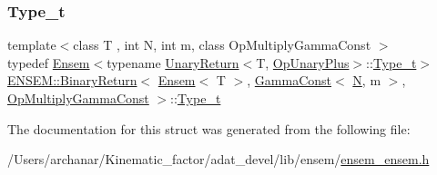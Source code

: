 \subsubsection{\texorpdfstring{Type\_t}{Type\_t}\hspace{0.1cm}{\footnotesize\ttfamily [2/2]}}
{\footnotesize\ttfamily template$<$class T , int N, int m, class Op\+Multiply\+Gamma\+Const $>$ \\
typedef \mbox{\hyperlink{classENSEM_1_1Ensem}{Ensem}}$<$typename \mbox{\hyperlink{structENSEM_1_1UnaryReturn}{Unary\+Return}}$<$T, \mbox{\hyperlink{structENSEM_1_1OpUnaryPlus}{Op\+Unary\+Plus}}$>$\+::\mbox{\hyperlink{structENSEM_1_1BinaryReturn_3_01Ensem_3_01T_01_4_00_01GammaConst_3_01N_00_01m_01_4_00_01OpMultiplyGammaConst_01_4_a1e55c80ef6e9dca68a09e4de3cc64da6}{Type\+\_\+t}}$>$ \mbox{\hyperlink{structENSEM_1_1BinaryReturn}{E\+N\+S\+E\+M\+::\+Binary\+Return}}$<$ \mbox{\hyperlink{classENSEM_1_1Ensem}{Ensem}}$<$ T $>$, \mbox{\hyperlink{classENSEM_1_1GammaConst}{Gamma\+Const}}$<$ \mbox{\hyperlink{operator__name__util_8cc_a7722c8ecbb62d99aee7ce68b1752f337}{N}}, m $>$, \mbox{\hyperlink{structENSEM_1_1OpMultiplyGammaConst}{Op\+Multiply\+Gamma\+Const}} $>$\+::\mbox{\hyperlink{structENSEM_1_1BinaryReturn_3_01Ensem_3_01T_01_4_00_01GammaConst_3_01N_00_01m_01_4_00_01OpMultiplyGammaConst_01_4_a1e55c80ef6e9dca68a09e4de3cc64da6}{Type\+\_\+t}}}



The documentation for this struct was generated from the following file\+:\begin{DoxyCompactItemize}
\item 
/\+Users/archanar/\+Kinematic\+\_\+factor/adat\+\_\+devel/lib/ensem/\mbox{\hyperlink{lib_2ensem_2ensem__ensem_8h}{ensem\+\_\+ensem.\+h}}\end{DoxyCompactItemize}
